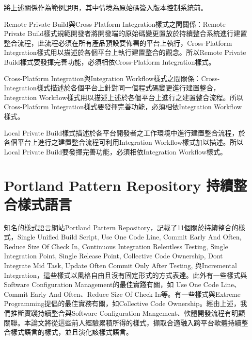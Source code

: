 將上述關係作為範例說明，其中情境為原始碼簽入版本控制系統前。\begin{description}
\item Remote Private Build與Cross-Platform Integration樣式之間關係：Remote Private Build樣式規範開發者將開發端的原始碼變更置放於持續整合系統進行建置整合流程，此流程必須在所有產品預設要佈署的平台上執行，Cross-Platform Integration樣式用以描述於各個平台上執行建置整合的觀念。所以Remote Private Build樣式要發揮完善功能，必須相依Cross-Platform Integration樣式。
\item Cross-Platform Integration與Integration Workflow樣式之間關係：Cross-Integration樣式描述於各個平台上針對同一個程式碼變更進行建置整合，Integration Workflow樣式用以描述上述於各個平台上進行之建置整合流程。所以Cross-Platform Integration樣式要發揮完善功能，必須相依Integration Workflow樣式。
\item Local Private Build樣式描述於各平台開發者之工作環境中進行建置整合流程，於各個平台上進行之建置整合流程可利用Integration Workflow樣式加以描述。所以Local Private Build要發揮完善功能，必須相依Integration Workflow樣式。
\end{description}

\section{Portland Pattern Repository 持續整合樣式語言}
知名的樣式語言網站Portland Pattern Repository\cite{portlandcipatterns}，記載了11個關於持續整合的樣式，Single Unified Build Script, Use One Code Line, Commit Early And Often, Reduce Size Of Check In, Continuous Integration Relentless Testing, Single Integration Point, Single Release Point, Collective Code Ownership, Dont Integrate Mid Task, Update Often Commit Only After Testing, 與Incremental Integration，這些樣式以風格自由且沒有固定形式的方式表達。此外有一些樣式與Software Configuration Management\cite{scm}的最佳實踐有關，如 Use One Code Line、Commit Early And Often、Reduce Size Of Check In等。有一些樣式與Extreme Programming\cite{xp}提倡的最佳實務有關，如Collective Code Ownership。經由上述，我們推斷實踐持續整合與Software Configuration Mangement、軟體開發流程有明顯關聯。本論文將從這些前人經驗累積所得的樣式，擷取合適融入跨平台軟體持續整合樣式語言的樣式，並且演化該樣式語言。

